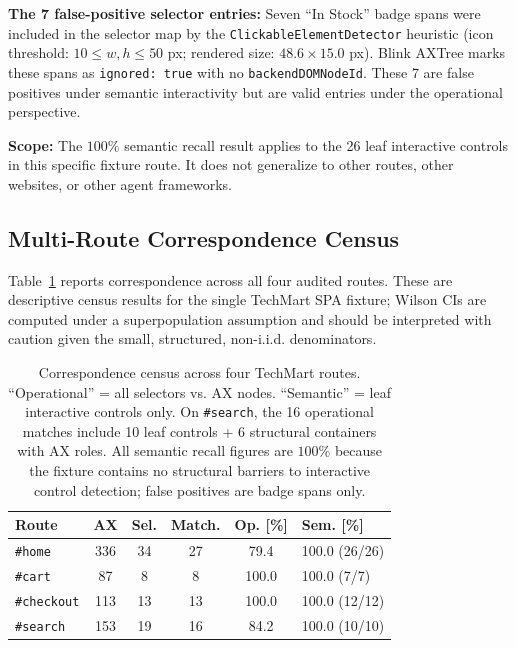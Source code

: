 \documentclass[conference]{IEEEtran}
\begin{document}
\textbf{The 7 false-positive selector entries:} Seven ``In Stock'' badge spans were included in the selector map by the \texttt{ClickableElementDetector} heuristic (icon threshold: $10 \leq w, h \leq 50$ px; rendered size: $48.6 \times 15.0$ px). Blink AXTree marks these spans as \texttt{ignored: true} with no \texttt{backendDOMNodeId}. These 7 are false positives under semantic interactivity but are valid entries under the operational perspective.

\textbf{Scope:} The $100\%$ semantic recall result applies to the 26 leaf interactive controls in this specific fixture route. It does not generalize to other routes, other websites, or other agent frameworks.

\subsection{Multi-Route Correspondence Census}

Table~\ref{tab:multi_route} reports correspondence across all four audited routes. These are descriptive census results for the single TechMart SPA fixture; Wilson CIs are computed under a superpopulation assumption and should be interpreted with caution given the small, structured, non-i.i.d. denominators.

\begin{table}[t]
\centering
\footnotesize
\caption{Correspondence census across four TechMart routes. ``Operational'' = all selectors vs. AX nodes. ``Semantic'' = leaf interactive controls only. On \texttt{\#search}, the 16 operational matches include 10 leaf controls + 6 structural containers with AX roles. All semantic recall figures are $100\%$ because the fixture contains no structural barriers to interactive control detection; false positives are badge spans only.}
\label{tab:multi_route}
\begin{tabular}{lccccl}
\toprule
\textbf{Route} & \textbf{AX} & \textbf{Sel.} & \textbf{Match.} & \textbf{Op. [\%]} & \textbf{Sem. [\%]} \\
\midrule
\texttt{\#home}     & 336 & 34 & 27 & 79.4 & 100.0 (26/26) \\
\texttt{\#cart}     &  87 &  8 &  8 & 100.0 & 100.0 (7/7) \\
\texttt{\#checkout} & 113 & 13 & 13 & 100.0 & 100.0 (12/12) \\
\texttt{\#search}   & 153 & 19 & 16 & 84.2  & 100.0 (10/10) \\
\bottomrule
\end{tabular}
\end{table}
\end{document}
